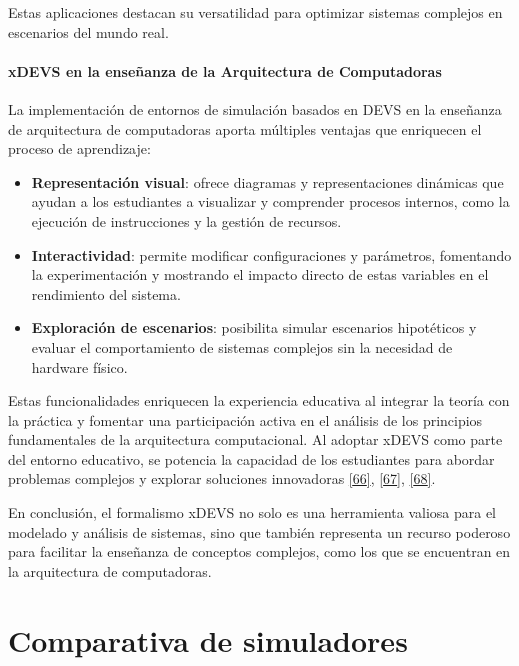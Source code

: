 \documentclass[12pt,oneside]{templates/unerthesis}
\providecommand{\tightlist}{%
  \setlength{\itemsep}{0pt}\setlength{\parskip}{0pt}}
\begin{document}
Estas aplicaciones destacan su versatilidad para optimizar sistemas complejos en escenarios del mundo real.

\hypertarget{xdevs-en-la-enseuxf1anza-de-la-arquitectura-de-computadoras}{%
\subsubsection{xDEVS en la enseñanza de la Arquitectura de Computadoras}\label{xdevs-en-la-enseuxf1anza-de-la-arquitectura-de-computadoras}}

La implementación de entornos de simulación basados en DEVS en la enseñanza de arquitectura de computadoras aporta múltiples ventajas que enriquecen el proceso de aprendizaje:

\begin{itemize}
\tightlist
\item
  \textbf{Representación visual}: ofrece diagramas y representaciones dinámicas que ayudan a los estudiantes a visualizar y comprender procesos internos, como la ejecución de instrucciones y la gestión de recursos.
\item
  \textbf{Interactividad}: permite modificar configuraciones y parámetros, fomentando la experimentación y mostrando el impacto directo de estas variables en el rendimiento del sistema.
\item
  \textbf{Exploración de escenarios}: posibilita simular escenarios hipotéticos y evaluar el comportamiento de sistemas complejos sin la necesidad de hardware físico.
\end{itemize}

Estas funcionalidades enriquecen la experiencia educativa al integrar la teoría con la práctica y fomentar una participación activa en el análisis de los principios fundamentales de la arquitectura computacional. Al adoptar xDEVS como parte del entorno educativo, se potencia la capacidad de los estudiantes para abordar problemas complejos y explorar soluciones innovadoras \protect\hyperlink{ref-calvo_valdes_simulador_2010}{{[}66{]}}, \protect\hyperlink{ref-Llorente2016xDEVS}{{[}67{]}}, \protect\hyperlink{ref-bryant2018verification}{{[}68{]}}.

En conclusión, el formalismo xDEVS no solo es una herramienta valiosa para el modelado y análisis de sistemas, sino que también representa un recurso poderoso para facilitar la enseñanza de conceptos complejos, como los que se encuentran en la arquitectura de computadoras.

\hypertarget{comparativa}{%
\chapter{Comparativa de simuladores}\label{comparativa}}
\end{document}
